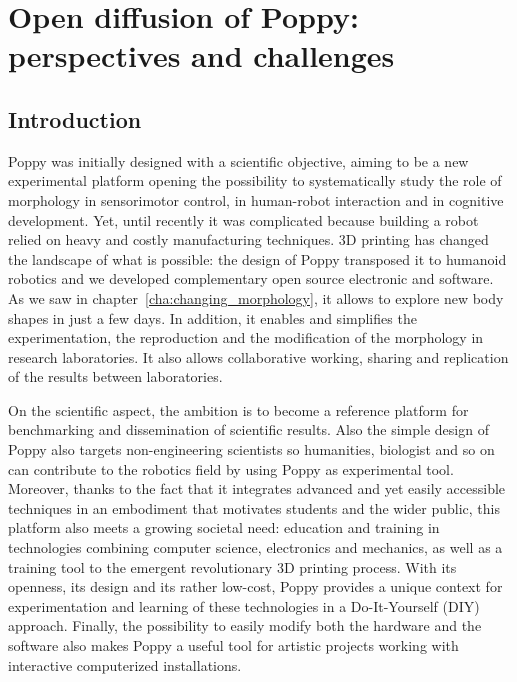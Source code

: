 
\cleartoleftpage


\chapter{Open diffusion of Poppy: perspectives and challenges} %
\label{cha:diffusion}

\section{Introduction} %

Poppy was initially designed with a scientific objective, aiming to be a new experimental platform opening the possibility to systematically study the role of morphology in sensorimotor control, in human-robot interaction and in cognitive development. Yet, until recently it was complicated because building a robot relied on heavy and costly manufacturing techniques. 3D printing has changed the landscape of what is possible: the design of Poppy transposed it to humanoid robotics and we developed complementary open source electronic and software. As we saw in chapter~\ref{cha:changing_morphology}, it allows to explore new body shapes in just a few days.
In addition, it enables and simplifies the experimentation, the reproduction and the modification of the morphology in research laboratories. It also allows collaborative working, sharing and replication of the results between laboratories.

On the scientific aspect, the ambition is to become a reference platform for benchmarking and dissemination of scientific results. Also the simple design of Poppy also targets non-engineering scientists so humanities, biologist and so on can contribute to the robotics field by using Poppy as experimental tool.
Moreover, thanks to the fact that it integrates advanced and yet easily accessible techniques in an embodiment that motivates students and the wider public, this platform also meets a growing societal need: education and training in technologies combining computer science, electronics and mechanics, as well as a training tool to the emergent revolutionary 3D printing process. With its openness, its design and its rather low-cost, Poppy provides a unique context for experimentation and learning of these technologies in a Do-It-Yourself (DIY) approach.
Finally, the possibility to easily modify both the hardware and the software also makes Poppy a useful tool for artistic projects working with interactive computerized installations.

